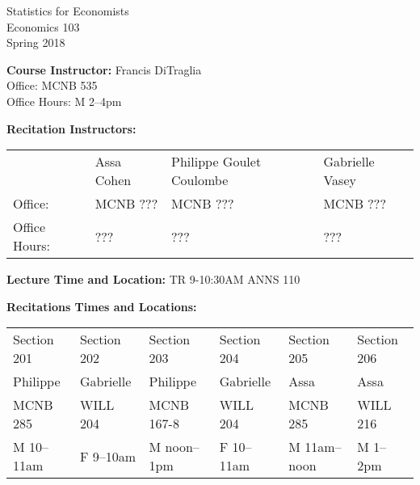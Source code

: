 \documentclass[11pt, letterpaper]{article}
\begin{document}
\thispagestyle{plain}

\begin{center}
\Large
\sc
Statistics for Economists\\
\large
Economics 103\\
\large
Spring 2018
\end{center}



\normalsize

\noindent \textbf{Course Instructor:} Francis DiTraglia \\
Office: MCNB 535\\
Office Hours: M 2--4pm 

\medskip


\noindent \textbf{Recitation Instructors:}

\medskip
\noindent

\begin{tabular}{llll}
  & Assa Cohen & Philippe Goulet Coulombe & Gabrielle Vasey\\
Office:& MCNB ??? & MCNB ??? & MCNB ??? \\ 
Office Hours:& ??? & ??? & ??? 
\end{tabular}

\medskip
 
\noindent \textbf{Lecture Time and Location:} TR 9-10:30AM ANNS 110 

\medskip

\noindent \textbf{Recitations Times and Locations:}
\medskip \noindent

\begin{tabular}{llllll}
	Section 201 & Section 202 & Section 203 & Section 204 & Section 205 & Section 206\\ 
  Philippe & Gabrielle & Philippe & Gabrielle & Assa & Assa\\
	MCNB 285 & WILL 204 & MCNB 167-8 & WILL 204 & MCNB 285 & WILL 216 \\ 
  M 10--11am & F 9--10am & M noon--1pm & F 10--11am & M 11am--noon & M 1--2pm
\end{tabular}


\medskip

%
\end{document}
